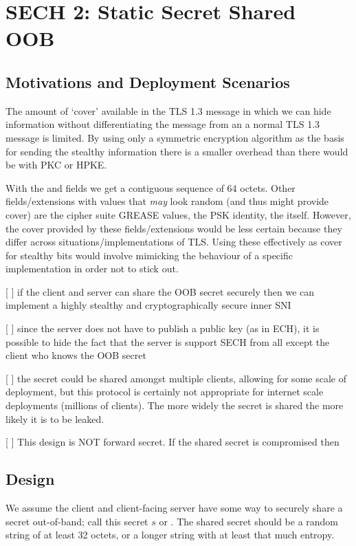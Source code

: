 \section{SECH 2: Static Secret Shared OOB}
\subsection{Motivations and Deployment Scenarios}

The amount of `cover' available in the TLS 1.3  message in which we can hide information without differentiating the message from an a normal TLS 1.3 message is limited. By using only a symmetric encryption algorithm as the basis for sending the stealthy information there is a smaller overhead than there would be with PKC or HPKE.

With the  and  fields we get a contiguous sequence of 64 octets. Other fields/extensions with values that {\em may} look random (and thus might provide cover) are the cipher suite GREASE values, the PSK identity, the  itself. However, the cover provided by these fields/extensions would be less certain because they differ across situations/implementations of TLS. Using these effectively as cover for stealthy bits would involve mimicking the behaviour of a specific implementation in order not to stick out.

[ ] if the client and server can share the OOB secret securely then we can implement a highly stealthy and cryptographically secure inner SNI

[ ] since the server does not have to publish a public key (as in ECH), it is possible to hide the fact that the server is support SECH from all except the client who knows the OOB secret

[ ] the secret could be shared amongst multiple clients, allowing for some scale of deployment, but this protocol is certainly not appropriate for internet scale deployments (millions of clients). The more widely the secret is shared the more likely it is to be leaked.

[ ] This design is NOT forward secret. If the shared secret is compromised then 

\subsection{Design}

We assume the client and client-facing server have some way to securely share a secret out-of-band; call this secret $s$ or . The shared secret should be a random string of at least 32 octets, or a longer string with at least that much entropy.


